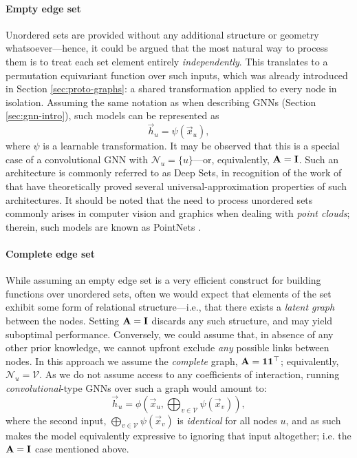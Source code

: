 \paragraph*{Empty edge set}

Unordered sets are provided without any additional structure or geometry whatsoever---hence, it could be argued that the most natural way to process them is to treat each set element entirely \emph{independently}. This translates to a permutation equivariant function over such inputs, which was already introduced in Section \ref{sec:proto-graphs}: a shared transformation applied to every node in isolation. Assuming the same notation as when describing GNNs (Section \ref{sec:gnn-intro}), such models can be represented as
\begin{equation*}
    \vec{h}_u = \psi(\vec{x}_u),
\end{equation*}
where $\psi$ is a learnable transformation. It may be observed that this is a special case of a convolutional GNN with $\mathcal{N}_u = \{u\}$---or, equivalently, ${\bf A} = {\bf I}$. Such an architecture is commonly referred to as Deep Sets, in recognition of the work of \cite{zaheer2017deep} that have theoretically proved several universal-approximation properties of such architectures. It should be noted that the need to process unordered sets commonly arises in computer vision and graphics when dealing with \emph{point clouds}; therein, such models are known as PointNets \citep{qi2017pointnet}.



\paragraph*{Complete edge set}%

While assuming an empty edge set is a very efficient construct for building functions over unordered sets, often we would expect that elements of the set exhibit some form of relational structure---i.e., that there exists a \emph{latent graph} between the nodes. Setting ${\bf A} = {\bf I}$ discards any such structure, and may yield suboptimal performance.
%
Conversely, we could assume that, in absence of any other prior knowledge, we cannot upfront exclude \emph{any} possible links between nodes. In this approach we assume the \emph{complete} graph, ${\bf A} = {\bf 1}{\bf 1}^\top$; equivalently, $\mathcal{N}_u = \mathcal{V}$.
%
As we do not assume access to any coefficients of interaction, running {\em convolutional}-type GNNs over such a graph would amount to:
\begin{equation*}
\vec{h}_u = \phi\left(\vec{x}_u, \bigoplus_{v\in \mathcal{V}} \psi(\vec{x}_v)\right),
\end{equation*}
where the second input, $\bigoplus_{v\in \mathcal{V}} \psi(\vec{x}_v)$ is \emph{identical} for all nodes $u$, and as such makes the model equivalently expressive to ignoring that input altogether; i.e. the ${\bf A} = {\bf I}$ case mentioned above. 

